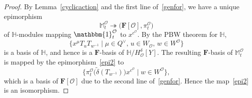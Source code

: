 \documentclass[pdftex]{sigma}
\numberwithin{equation}{section}
\begin{document}
\begin{proof}By Lemma~\ref{cyclicaction} and the first line of~\eqref{genfor}, we have a unique epimorphism
\begin{equation}\label{epi2}
\mathbb{M}_{t}^\mathcal{O}\twoheadrightarrow \bigl(\mathbf{F}[\mathcal{O}],\pi_{t}^\mathcal{O}\bigr)
\end{equation}
of $\mathbb{H}$-modules mapping $\mathbbm{1}_{t}^\mathcal{O}$ to $x^{c^\mathcal{O}}$. By the PBW theorem for $\mathbb{H}$,
\[
\bigl\{x^\mu T_uT_{w^{-1}}\mid \mu\in Q^\vee,\, u\in W_\mathcal{O},\, w\in W^\mathcal{O} \bigr\}
\]
is a basis of $\mathbb{H}$, and hence  is a $\mathbf{F}$-basis of $\mathbb{H}/H_\mathcal{O}^\delta[Y]$. The resulting $\mathbf{F}$-basis
 of $\mathbb{M}_{t}^\mathcal{O}$ is mapped by the epimorphism~\eqref{epi2} to
\[
\bigl\{\pi_{t}^\mathcal{O}\bigl(\widetilde{\delta}(T_{w^{-1}})\bigr)x^{c^\mathcal{O}}\mid w\in W^\mathcal{O}\bigr\},
\]
which is a basis of $\mathbf{F}[\mathcal{O}]$ due to the second line of~\eqref{genfor}. Hence the map~\eqref{epi2} is an isomorphism.
\end{proof}
\end{document}

